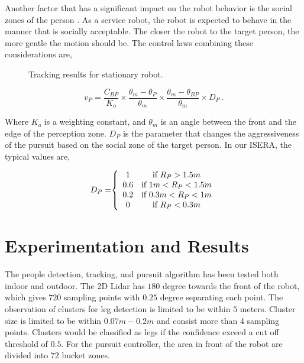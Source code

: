 \documentclass[10 pt,a4paper,conference]{IEEEtran}
\begin{document}
Another factor that has a significant impact on the robot behavior is
the social zones of the person \cite{ref10}. As a service robot, the
robot is expected to behave in the manner that is socially acceptable.
The closer the robot to the target person, the more gentle the motion
should be. The control laws combining these considerations are,

\begin{figure*}[!t]
\centering
{}
\hfil
{}
\caption{Tracking results for stationary robot.}
\label{fig_static_result}
\end{figure*}

\begin{equation}
v_P=\frac{C_{BP}}{K_o}\times\frac{\theta_m-\theta_P}{\theta_m}\times
\frac{\theta_m-\theta_{BP}}{\theta_m}\times D_P\,.
\label{eq:forwardvel}
\end{equation}

Where \(K_o\) is a weighting constant, and \(\theta_m\) is an angle
between the front and the edge of the perception zone. \(D_P\) is the
parameter that changes the aggressiveness of the pursuit based on the
social zone of the target person. In our ISERA, the typical values are,

\begin{eqnarray}
D_P =\hspace{-1mm} \left\{
\begin{array}{cc}
1 & \textrm{if } R_P>1.5m\\
0.6 & \textrm{if } 1m<R_P<1.5m\\
0.2 & \textrm{if } 0.3m<R_P<1m\\
0& \textrm{if } R_P<0.3m\\
\end{array}
\right.
\end{eqnarray}

\section{Experimentation and Results}\label{experimentation-and-results}

The people detection, tracking, and pursuit algorithm has been tested
both indoor and outdoor. The 2D Lidar has \(180\) degree towards the
front of the robot, which gives \(720\) sampling points with \(0.25\)
degree separating each point. The observation of clusters for leg
detection is limited to be within \(5\) meters. Cluster size is limited
to be within \(0.07m - 0.2m\) and consist more than 4 sampling points.
Clusters would be classified as legs if the confidence exceed a cut off
threshold of \(0.5\). For the pursuit controller, the area in front of
the robot are divided into \(72\) bucket zones.
\end{document}
